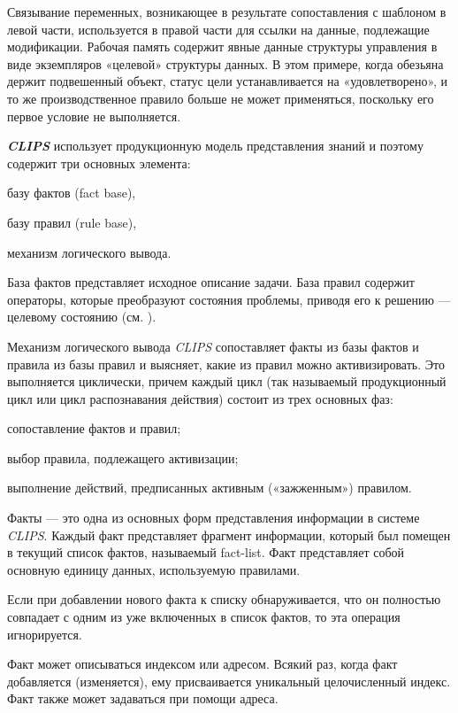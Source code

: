 Связывание переменных, возникающее в результате сопоставления с шаблоном в левой части, используется в правой части для ссылки на данные, подлежащие модификации. Рабочая память содержит явные данные структуры управления в виде экземпляров «целевой» структуры данных. В этом примере, когда обезьяна держит подвешенный объект, статус цели устанавливается на «удовлетворено», и то же производственное правило больше не может применяться, поскольку его первое условие не выполняется.

\textbf{\textit{CLIPS}} использует продукционную модель представления знаний и поэтому содержит три основных элемента:
\begin{textitemize}
	\item{базу фактов (fact base),}
	\item{базу правил (rule base),}
	\item{механизм логического вывода.}
\end{textitemize}
База фактов представляет исходное описание задачи. База правил содержит операторы, которые преобразуют состояния проблемы, приводя его к решению --- целевому состоянию (см. ).

Механизм логического вывода \textit{CLIPS} сопоставляет факты из базы фактов и правила из базы правил и выясняет, какие из правил можно активизировать. Это выполняется циклически, причем каждый цикл (так называемый продукционный цикл или цикл распознавания действия) состоит из трех основных фаз:
\begin{textitemize}
	\item{сопоставление фактов и правил;}
	\item{выбор правила, подлежащего активизации;}
	\item{выполнение действий, предписанных активным («зажженным») правилом.}
\end{textitemize}

Факты --- это одна из основных форм представления информации в системе \textit{CLIPS}. Каждый факт представляет фрагмент информации, который был помещен в текущий список фактов, называемый fact-list. Факт представляет собой основную единицу данных, используемую правилами.

Если при добавлении нового факта к списку обнаруживается, что он полностью совпадает с одним из уже включенных в список фактов, то эта операция игнорируется.

Факт может описываться индексом или адресом. Всякий раз, когда факт добавляется (изменяется), ему присваивается уникальный целочисленный индекс. Факт также может задаваться при помощи адреса.

